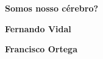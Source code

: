 \textbf{Somos nosso cérebro?} \lipsum[1]

\textbf{Fernando Vidal} \lipsum[1]

\textbf{Francisco Ortega} \lipsum[1]
